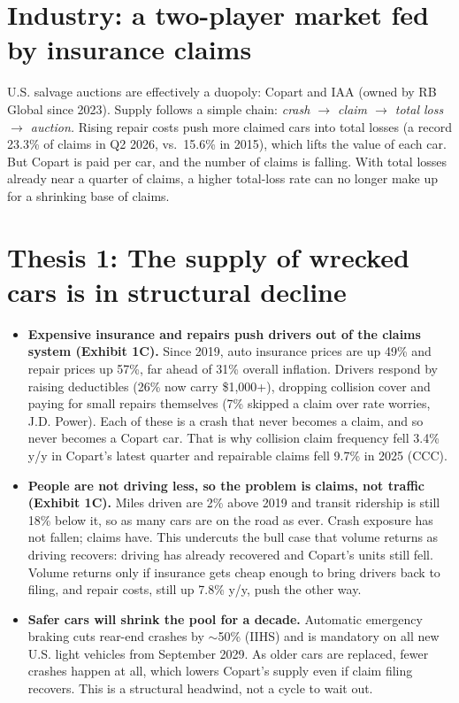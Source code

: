 \documentclass[10pt]{article}
\begin{document}
\section{Industry: a two-player market fed by insurance claims}
U.S. salvage auctions are effectively a duopoly: Copart and IAA (owned by RB Global since 2023). Supply follows a simple chain: \emph{crash $\rightarrow$ claim $\rightarrow$ total loss $\rightarrow$ auction.} Rising repair costs push more claimed cars into total losses (a record 23.3\% of claims in Q2 2026, vs.\ 15.6\% in 2015), which lifts the value of each car. But Copart is paid per car, and the number of claims is falling. With total losses already near a quarter of claims, a higher total-loss rate can no longer make up for a shrinking base of claims.

\section{Thesis 1: The supply of wrecked cars is in structural decline}
\begin{itemize}
  \item \textbf{Expensive insurance and repairs push drivers out of the claims system (Exhibit 1C).} Since 2019, auto insurance prices are up 49\% and repair prices up 57\%, far ahead of 31\% overall inflation. Drivers respond by raising deductibles (26\% now carry \$1,000+), dropping collision cover and paying for small repairs themselves (7\% skipped a claim over rate worries, J.D. Power). Each of these is a crash that never becomes a claim, and so never becomes a Copart car. That is why collision claim frequency fell 3.4\% y/y in Copart's latest quarter and repairable claims fell 9.7\% in 2025 (CCC).
  \item \textbf{People are not driving less, so the problem is claims, not traffic (Exhibit 1C).} Miles driven are 2\% above 2019 and transit ridership is still 18\% below it, so as many cars are on the road as ever. Crash exposure has not fallen; claims have. This undercuts the bull case that volume returns as driving recovers: driving has already recovered and Copart's units still fell. Volume returns only if insurance gets cheap enough to bring drivers back to filing, and repair costs, still up 7.8\% y/y, push the other way.
  \item \textbf{Safer cars will shrink the pool for a decade.} Automatic emergency braking cuts rear-end crashes by $\sim$50\% (IIHS) and is mandatory on all new U.S. light vehicles from September 2029. As older cars are replaced, fewer crashes happen at all, which lowers Copart's supply even if claim filing recovers. This is a structural headwind, not a cycle to wait out.
\end{itemize}
\end{document}

